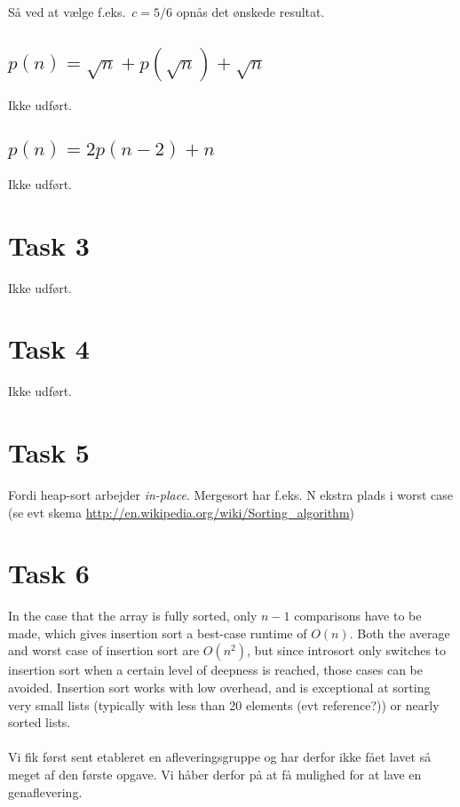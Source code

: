 \documentclass[paper=a4, fleqn]{article}
\begin{document}
Så ved at vælge f.eks.\ $c=5/6$ opnås det ønskede resultat.

\subsection*{$p(n)=\sqrt{n}+p(\sqrt{n})+\sqrt{n}$}

Ikke udført.

\subsection*{$p(n)=2p(n-2)+n$}

Ikke udført.

\section*{Task 3}

Ikke udført.

\section*{Task 4}

Ikke udført.

\section*{Task 5}

Fordi heap-sort arbejder {\em in-place}. Mergesort har f.eks. N ekstra plads i
worst case (se evt skema \url{http://en.wikipedia.org/wiki/Sorting_algorithm})

\section*{Task 6}

In the case that the array is fully sorted, only $n-1$ comparisons have to be
made, which gives insertion sort a best-case runtime of $O(n)$. Both the average
and worst case of insertion sort are $O(n^2)$, but since introsort only switches
to insertion sort when a certain level of deepness is reached, those cases can
be avoided. Insertion sort works with low overhead, and is exceptional at
sorting very small lists (typically with less than 20 elements (evt reference?))
or nearly sorted lists.

\paragraph{}

Vi fik først sent etableret en afleveringsgruppe og har derfor ikke fået lavet
så meget af den første opgave. Vi håber derfor på at få mulighed for at lave en
genaflevering.
\end{document}
